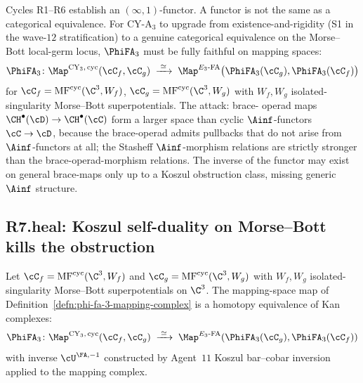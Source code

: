 Cycles R1--R6 establish an $(\infty,1)$-functor.  A functor is not the
same as a categorical equivalence.  For CY-A$_3$ to upgrade from
existence-and-rigidity (S1 in the wave-$12$ stratification) to a
genuine categorical equivalence on the Morse--Bott local-germ locus,
$\PhiFA_3$ must be fully faithful on mapping spaces:
\[
  \PhiFA_3
  \colon
  \Map^{\mathrm{CY}_3,\,\mathrm{cyc}}(\cC_f, \cC_g)
  \;\xrightarrow{\;\simeq\;}\;
  \Map^{E_3\text{-FA}}\bigl(\PhiFA_3(\cC_g), \PhiFA_3(\cC_f)\bigr)
\]
for $\cC_f = \mathrm{MF}^{\mathrm{cyc}}(\C^3, W_f)$,
$\cC_g = \mathrm{MF}^{\mathrm{cyc}}(\C^3, W_g)$ with $W_f, W_g$
isolated-singularity Morse--Bott superpotentials.  The attack: brace-
operad maps $\CH^\bullet(\cD) \to \CH^\bullet(\cC)$ form a larger space
than cyclic $\Ainf$-functors $\cC \to \cD$, because the brace-operad
admits pullbacks that do not arise from $\Ainf$-functors at all; the
Stasheff $\Ainf$-morphism relations are strictly stronger than the
brace-operad-morphism relations.  The inverse of the functor may exist
on general brace-maps only up to a Koszul obstruction class, missing
generic $\Ainf$ structure.

\subsection*{R7.heal: Koszul self-duality on Morse--Bott kills the obstruction}

\begin{proposition}
\label{prop:fully-faithful-morse-bott}
\ClaimStatusProvedHere
Let $\cC_f = \mathrm{MF}^{\mathrm{cyc}}(\C^3, W_f)$ and
$\cC_g = \mathrm{MF}^{\mathrm{cyc}}(\C^3, W_g)$ with $W_f, W_g$
isolated-singularity Morse--Bott superpotentials on $\C^3$.  The
mapping-space map of Definition~\ref{defn:phi-fa-3-mapping-complex} is
a homotopy equivalence of Kan complexes:
\[
 \PhiFA_3 \colon
 \Map^{\mathrm{CY}_3,\,\mathrm{cyc}}(\cC_f, \cC_g)
 \;\xrightarrow{\;\simeq\;}\;
 \Map^{E_3\text{-FA}}(\PhiFA_3(\cC_g), \PhiFA_3(\cC_f))
\]
with inverse $\cU^{\FA,-1}$ constructed by Agent~$11$ Koszul bar--cobar
inversion applied to the mapping complex.
\end{proposition}

